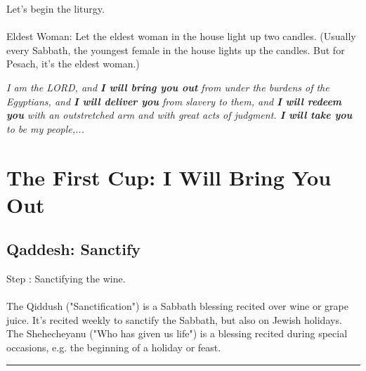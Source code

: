 \documentclass[10pt,oneside,footinclude=true,headinclude=true]{scrbook} %
\newcommand\pagequot[1]{
	\newpage
	\clearscrheadfoot
	\vspace*{\stretch{2}}
	\begin{center}
	\begin{minipage}[c]{8cm}
		#1
	\end{minipage}
	\end{center}
	\vspace*{\stretch{3}}
}
\newcommand{\positionbox}[3]{
	\begin{tikzpicture}
		\node[inner sep=0pt] at ($(current page.north west) + (#1,-#2)$)
			{\transparent{0.1}\texttt{[image: \#3]}};
	\end{tikzpicture}
}
\newcommand{\drawimage}[4]{
	\makebox[0pt][s]{
		\raisebox{#1}[0pt][0pt]{
			\transparent{#2}\texttt{[image: \#4]}
		}
	}
}
\begin{document}
\noindent Let's begin the liturgy.\\
\\
\small
Eldest Woman: Let the eldest woman in the house light up two candles. (Usually every Sabbath, the youngest female in the house lights up the candles. But for Pesach, it's the eldest woman.)\\



\normalsize
\pagequot{
\centering
\textit{I am the LORD, and \textbf{I will bring you out} from under the burdens of the Egyptians, and \textbf{I will deliver you} from slavery to them, and \textbf{I will redeem you} with an outstretched arm and with great acts of judgment. \textbf{I will take you} to be my people,...}\\
\bigskip
\spacedlowsmallcaps{Exodus 6:6-8}
}

\part{The First Cup: I Will Bring You Out}

\chapter{Qaddesh: Sanctify} 


\normalsize
Step \thechapter: Sanctifying the wine.\\
\\
The Qiddush ("Sanctification") is a Sabbath blessing recited over wine or grape juice. It's recited weekly to sanctify the Sabbath, but also on Jewish holidays. The Shehecheyanu ("Who has given us life") is a blessing recited during special occasions, e.g. the beginning of a holiday or feast.

\vspace{5mm}
\hrule
\vspace{5mm}
\end{document}
